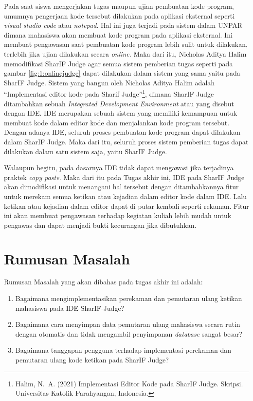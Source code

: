 \documentclass[a4paper,twoside]{article}
\begin{document}
Pada saat siswa mengerjakan tugas maupun ujian pembuatan kode program, umumnya pengerjaan kode tersebut dilakukan pada aplikasi eksternal seperti \textit{visual studio code} atau \textit{notepad}. Hal ini juga terjadi pada sistem dalam UNPAR dimana mahasiswa akan membuat kode program pada aplikasi eksternal. Ini membuat pengawasan saat pembuatan kode program lebih sulit untuk dilakukan, terlebih jika ujian dilakukan secara \textit{online}. Maka dari itu, Nicholas Aditya Halim memodifikasi SharIF Judge agar semua sistem pemberian tugas seperti pada gambar \ref{fig:1:onlinejudge} dapat dilakukan dalam sistem yang sama yaitu pada SharIF Judge. Sistem yang bangun oleh Nicholas Aditya Halim adalah ``Implementasi editor kode pada Sharif Judge''\footnote{Halim, N.~A. (2021) {Implementasi Editor Kode pada SharIF Judge}. Skripsi. Universitas Katolik Parahyangan,  Indonesia.}, dimana SharIF Judge ditambahkan sebuah \textit{Integrated Development Environment} atau yang disebut dengan IDE. IDE merupakan sebuah sistem yang memiliki kemampuan untuk membuat kode dalam editor kode dan menjalankan kode program tersebut. Dengan adanya IDE, seluruh proses pembuatan kode program dapat dilakukan dalam SharIF Judge. Maka dari itu, seluruh proses sistem pemberian tugas dapat dilakukan dalam satu sistem saja, yaitu SharIF Judge.

Walaupun begitu, pada dasarnya IDE tidak dapat mengawasi jika terjadinya praktek \textit{copy paste}. Maka dari itu pada Tugas akhir ini, IDE pada SharIF Judge akan dimodifikasi untuk menangani hal tersebut dengan ditambahkannya fitur untuk merekam semua ketikan atau kejadian dalam editor kode dalam IDE. Lalu ketikan atau kejadian dalam editor dapat di putar kembali seperti rekaman. Fitur ini akan membuat pengawasan terhadap kegiatan kuliah lebih mudah untuk pengawas dan dapat menjadi bukti kecurangan jika dibutuhkan.

\section{Rumusan Masalah}

Rumusan Masalah yang akan dibahas pada tugas akhir ini adalah:
\begin{enumerate}
	\item Bagaimana mengimplementasikan perekaman dan pemutaran ulang ketikan mahasiswa pada IDE SharIF-Judge?
	\item Bagaimana cara menyimpan data pemutaran ulang mahasiswa secara rutin dengan otomatis dan tidak mengambil penyimpanan \textit{database} sangat besar?
	\item Bagaimana tanggapan pengguna terhadap implementasi perekaman dan pemutaran ulang kode ketikan pada SharIF Judge?
\end{enumerate}
\end{document}
